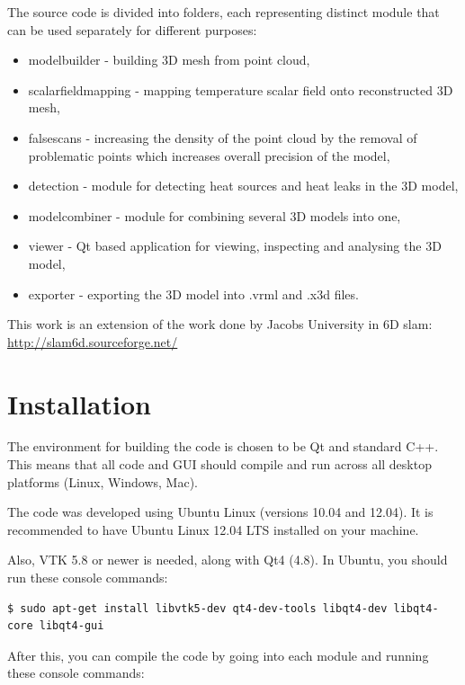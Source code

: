 \documentclass[11pt]{article} %
\begin{document}
The source code is divided into folders, each representing distinct module that can be used separately for different purposes:

\begin{itemize}

\item modelbuilder - building 3D mesh from point cloud,
\item scalarfieldmapping - mapping temperature scalar field onto reconstructed 3D mesh,
\item falsescans - increasing the density of the point cloud by the removal of problematic points which increases overall precision of the model,
\item detection - module for detecting heat sources and heat leaks in the 3D model,
\item modelcombiner - module for combining several 3D models into one,
\item viewer - Qt based application for viewing, inspecting and analysing the 3D model,
\item exporter - exporting the 3D model into .vrml and .x3d files.

\end{itemize}

This work is an extension of the work done by Jacobs University in 6D slam: \url{http://slam6d.sourceforge.net/}

\newpage

\section{Installation}

The environment for building the code is chosen to be Qt and standard C++. This means that all code and GUI should compile and run across all desktop platforms (Linux, Windows, Mac).

The code was developed using Ubuntu Linux (versions 10.04 and 12.04). It is recommended to have Ubuntu Linux 12.04 LTS installed on your machine.

Also, VTK 5.8 or newer is needed, along with Qt4 (4.8). In Ubuntu, you should run these console commands:

\begin{verbatim}
$ sudo apt-get install libvtk5-dev qt4-dev-tools libqt4-dev libqt4-core libqt4-gui
\end{verbatim}

After this, you can compile the code by going into each module and running these console commands:
\end{document}
